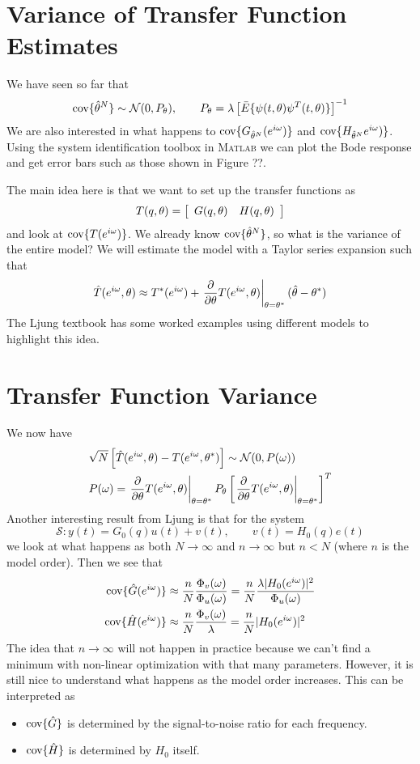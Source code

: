 \section{Variance of Transfer Function Estimates}
We have seen so far that
$$\text{cov}\{\hat{\theta}^N\}\sim\mathcal{N}(0,P_\theta), \qquad P_\theta = \lambda\left[\bar{E}\{\psi(t,\theta)\psi^T(t,\theta)\}\right]^{-1}$$
We are also interested in what happens to $\text{cov}\{G_{\hat{\theta}^N}(e^{i\omega})\}$ and $\text{cov}\{H_{\hat{\theta}^N}e^{i\omega})\}$. Using the system identification toolbox in \textsc{Matlab} we can plot the Bode response and get error bars such as those shown in Figure ??.

The main idea here is that we want to set up the transfer functions as
$$T(q,\theta) = \left[\begin{array}{c c} G(q,\theta) & H(q,\theta) \end{array}\right]$$
and look at $\text{cov}\{T(e^{i\omega})\}$. We already know $\text{cov}\{\hat{\theta}^N\}$, so what is the variance of the entire model? We will estimate the model with a Taylor series expansion such that
$$\hat{T}(e^{i\omega},\theta) \approx T^\ast(e^{i\omega}) + \left.\frac{\partial}{\partial\theta} T(e^{i\omega},\theta)\right|_{\theta=\theta^\ast}(\hat{\theta}-\theta^\ast)$$
The Ljung textbook has some worked examples using different models to highlight this idea.

\section{Transfer Function Variance}
We now have
\begin{align*}
&\sqrt{N}\left[\hat{T}(e^{i\omega},\theta) - T(e^{i\omega},\theta^\ast)\right] \sim \mathcal{N}(0,P(\omega)) \\
&P(\omega) = \left.\frac{\partial}{\partial\theta} T(e^{i\omega},\theta)\right|_{\theta=\theta^\ast} P_\theta \left[\left.\frac{\partial}{\partial\theta} T(e^{i\omega},\theta)\right|_{\theta=\theta^\ast}\right]^T
\end{align*}
Another interesting result from Ljung is that for the system
$$\mathcal{S}: y(t) = G_0(q)u(t)+v(t), \qquad v(t) = H_0(q)e(t)$$
we look at what happens as both $N\to\infty$ and $n\to\infty$ but $n<N$ (where $n$ is the model order). Then we see that
\begin{align*}
\text{cov}\{\hat{G}(e^{i\omega})\} &\approx \frac{n}{N}\frac{\Phi_v(\omega)}{\Phi_u(\omega)} = \frac{n}{N}\frac{\lambda|H_0(e^{i\omega})|^2}{\Phi_u(\omega)} \\
\text{cov}\{\hat{H}(e^{i\omega})\} &\approx \frac{n}{N}\frac{\Phi_v(\omega)}{\lambda} = \frac{n}{N}|H_0(e^{i\omega})|^2
\end{align*}
The idea that $n\to\infty$ will not happen in practice because we can't find a minimum with non-linear optimization with that many parameters. However, it is still nice to understand what happens as the model order increases. This can be interpreted as
\begin{itemize}
\item $\text{cov}\{\hat{G}\}$ is determined by the signal-to-noise ratio for each frequency.
\item $\text{cov}\{\hat{H}\}$ is determined by $H_0$ itself.
\end{itemize}

